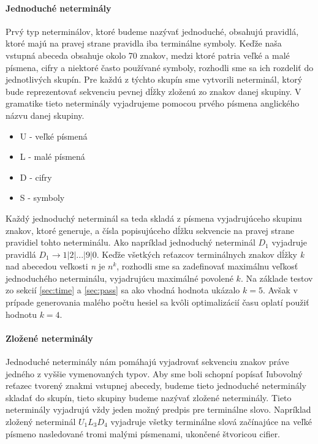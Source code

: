 \paragraph{Jednoduché neterminály}
Prvý typ neterminálov, ktoré budeme nazývať jednoduché, obsahujú pravidlá, ktoré majú na pravej strane pravidla iba terminálne symboly. Keďže naša vstupná abeceda obsahuje okolo 70 znakov, medzi ktoré patria veľké a malé písmena, cifry a niektoré často používané symboly, rozhodli sme sa ich rozdeliť do jednotlivých skupín. Pre každú z týchto skupín sme vytvorili neterminál, ktorý bude reprezentovať sekvenciu pevnej dĺžky zloženú zo znakov danej skupiny. V gramatike tieto neterminály vyjadrujeme pomocou prvého písmena anglického názvu danej skupiny.
\begin{itemize}
	\item U - veľké písmená
	\item L - malé písmená
	\item D - cifry
	\item S - symboly
\end{itemize}
Každý jednoduchý neterminál sa teda skladá z písmena vyjadrujúceho skupinu znakov, ktoré generuje, a čísla popisujúceho dĺžku sekvencie na pravej strane pravidiel tohto neterminálu. Ako napríklad jednoduchý neterminál \(D_1\) vyjadruje pravidlá \(D_1 \to 1 | 2 | ... | 9 | 0 \). Keďže všetkých reťazcov terminálnych znakov dĺžky \emph{k} nad abecedou veľkosti \emph{n} je \( n^k\), rozhodli sme sa zadefinovať maximálnu veľkosť jednoduchého neterminálu, vyjadrujúcu maximálné povolené \(k\). Na základe testov zo sekcií \ref{sec:time} a \ref{sec:pass} sa ako vhodná hodnota ukázalo \(k = 5\). Avšak v prípade generovania malého počtu hesiel sa kvôli optimalizácií času oplatí použiť hodnotu \(k = 4\).

\paragraph{Zložené neterminály}
Jednoduché neterminály nám pomáhajú vyjadrovať sekvenciu znakov práve jedného z vyššie vymenovaných typov. Aby sme boli schopní popísať ľubovolný reťazec tvorený znakmi vstupnej abecedy, budeme tieto jednoduché neterminály skladať do skupín, tieto skupiny budeme nazývať zložené neterminály. Tieto neterminály vyjadrujú vždy jeden možný predpis pre terminálne slovo. Napríklad zložený neterminál \(U_1L_3D_4\) vyjadruje všetky terminálne slová začínajúce na veľké písmeno nasledované tromi malými písmenami, ukončené štvoricou cifier.

